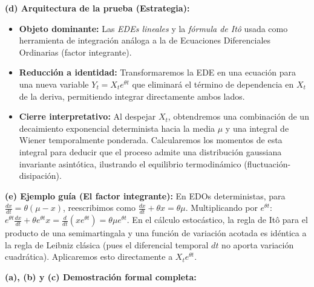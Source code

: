 \documentclass[11pt, letterpaper]{article}
\begin{document}
\vspace{5mm}

\begin{solucion}
    \textbf{(d) Arquitectura de la prueba (Estrategia):}
    \begin{itemize}
        \item[(i)] \textbf{Objeto dominante:} Las \textit{EDEs lineales} y la \textit{fórmula de Itô} usada como herramienta de integración análoga a la de Ecuaciones Diferenciales Ordinarias (factor integrante).
        \item[(ii)] \textbf{Reducción a identidad:} Transformaremos la EDE en una ecuación para una nueva variable $Y_t = X_t e^{\theta t}$ que eliminará el término de dependencia en $X_t$ de la deriva, permitiendo integrar directamente ambos lados.
        \item[(iii)] \textbf{Cierre interpretativo:} Al despejar $X_t$, obtendremos una combinación de un decaimiento exponencial determinista hacia la media $\mu$ y una integral de Wiener temporalmente ponderada. Calcularemos los momentos de esta integral para deducir que el proceso admite una distribución gaussiana invariante asintótica, ilustrando el equilibrio termodinámico (fluctuación-disipación).
    \end{itemize}

    \vspace{3mm}
    \textbf{(e) Ejemplo guía (El factor integrante):}
    En EDOs deterministas, para $\frac{dx}{dt} = \theta(\mu - x)$, reescribimos como $\frac{dx}{dt} + \theta x = \theta \mu$. Multiplicando por $e^{\theta t}$: $e^{\theta t}\frac{dx}{dt} + \theta e^{\theta t} x = \frac{d}{dt}(x e^{\theta t}) = \theta \mu e^{\theta t}$. 
    En el cálculo estocástico, la regla de Itô para el producto de una semimartingala y una función de variación acotada es idéntica a la regla de Leibniz clásica (pues el diferencial temporal $dt$ no aporta variación cuadrática). Aplicaremos esto directamente a $X_t e^{\theta t}$.

    \textbf{(a), (b) y (c) Demostración formal completa:}


\end{solucion}
\end{document}
